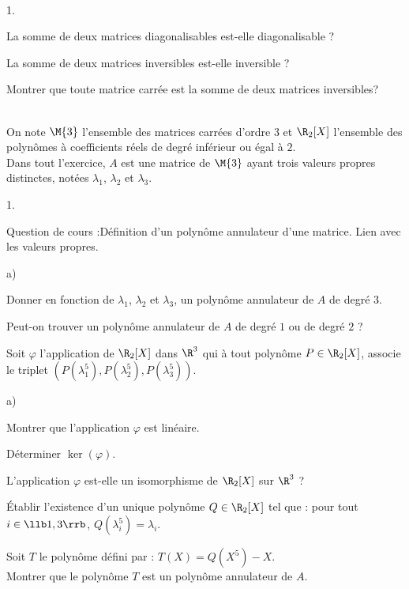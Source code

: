\documentclass[11pt]{article}%
\begin{document}
\begin{exerciceSP}~
  \begin{noliste}{1.}
    \setlength{\itemsep}{2mm}
  \item La somme de deux matrices diagonalisables est-elle
    diagonalisable ?
  \item La somme de deux matrices inversibles est-elle inversible ?
  \item Montrer que toute matrice carrée est la somme de deux matrices
    inversibles?
  \end{noliste}
\end{exerciceSP}


\newpage


\begin{exerciceAP}~\\
  On note $\M{3}$ l'ensemble des matrices carrées d'ordre $3$ et
  $\R_2[X]$ l'ensemble des polynômes à coefficients réels de degré
  inférieur ou égal à $2$.\\
  Dans tout l'exercice, $A$ est une matrice de $\M{3}$ ayant trois
  valeurs propres distinctes, notées $\lambda_1$, $\lambda_2$ et
  $\lambda_3$.
  \begin{noliste}{1.}
    \setlength{\itemsep}{2mm}
  \item Question de cours :Définition d'un polynôme annulateur d'une
    matrice. Lien avec les valeurs propres.
  \item
    \begin{noliste}{a)}
    \setlength{\itemsep}{2mm}
    \item Donner en fonction de $\lambda_1$, $\lambda_2$ et
      $\lambda_3$, un polynôme annulateur de $A$ de degré $3$.
    \item Peut-on trouver un polynôme annulateur de $A$ de degré $1$
      ou de degré $2$ ?
    \end{noliste}

  \item Soit $\varphi$ l'application de $\R_2[X]$ dans $\R^3$ qui à
    tout polynôme $P\in\R_2[X]$, associe le triplet
    $\left(P(\lambda_1^5),P(\lambda_2^5), P(\lambda_3^5)\right)$.
    \begin{noliste}{a)}
    \setlength{\itemsep}{2mm}
    \item Montrer que l'application $\varphi$ est linéaire.
    \item Déterminer $\ker(\varphi)$.
    \item L'application $\varphi$ est-elle un isomorphisme de
      $\R_2[X]$ sur $\R^3$ ?
    \item Établir l'existence d'un unique polynôme $Q\in\R_2[X]$ tel
      que : pour tout $i\in\llb1,3\rrb$, $Q(\lambda_i^5)=\lambda_i$.
    \item Soit $T$ le polynôme défini par : $T(X)=Q(X^5)-X$.\\
      Montrer que le polynôme $T$ est un polynôme annulateur de $A$.
    \end{noliste}


\end{noliste}
\end{exerciceAP}
\end{document}
